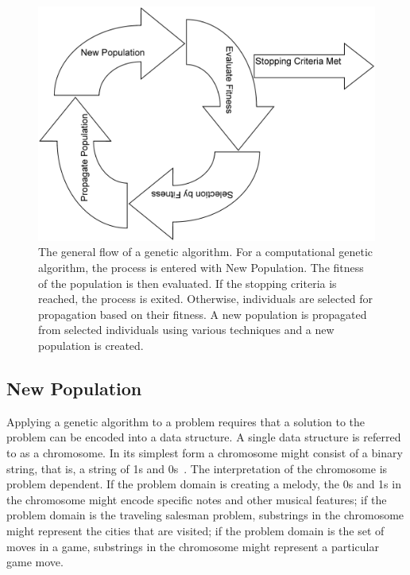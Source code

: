 \begin{figure}[htp]
\centerline{\includegraphics[width=1.0\columnwidth]{Figures/GAFlow.png}}
\caption[Genetic Algorithm Flow]{The general flow of a genetic algorithm. For a
computational genetic algorithm, the process is entered with New Population.
The fitness of the population is then evaluated. If the stopping criteria is
reached, the process is exited. Otherwise, individuals are selected for
propagation based on their fitness. A new population is propagated from
selected individuals using various techniques and a new population is created.}
\label{figure-gaflow}
\end{figure}

\subsection{New Population}

Applying a genetic algorithm to a problem requires that a solution to the
problem can be encoded into a data structure. A single data structure is
referred to as a chromosome. In its simplest form a chromosome might consist of
a binary string, that is, a string of 1s and
0s~\cite{Holland1992,goldberg1989genetic}.
The interpretation of the chromosome is problem dependent. If the problem domain
is creating a melody, the 0s and 1s in the chromosome might encode specific
notes and other musical features; if the problem domain is the traveling
salesman problem, substrings in the chromosome might represent the cities that
are visited; if the problem domain is the set of moves in a game, substrings in
the chromosome might represent a particular game move.

